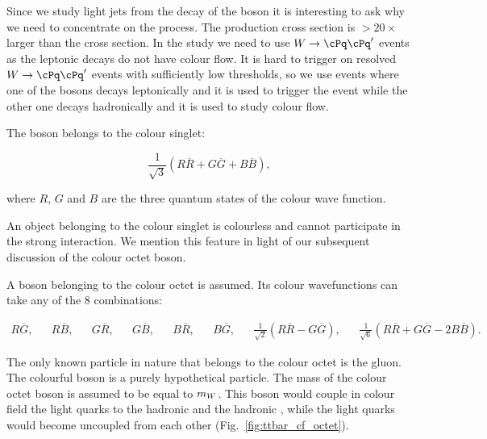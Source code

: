 Since we study light jets from the decay of the \PW boson it is interesting to ask why we need to concentrate on the \ttbar process. The \PW production cross section is $>20\times$ larger than the \ttbar cross section. In the study we need to use  $\PW\rightarrow\cPq\cPq'$ events as the leptonic decays do not have colour flow. It is hard to trigger on resolved $\PW\rightarrow\cPq\cPq'$ events with sufficiently low \pt thresholds, so we use \ttbar events where one of the \PW bosons decays leptonically and it is used to trigger the event while the other one decays hadronically and it is used to study colour flow.

The \PW boson belongs to the colour singlet:

\begin{equation}
\frac{1}{\sqrt{3}}\left(R\overline{R}+G\overline{G}+B\overline{B}\right),
\end{equation}

\noindent where $R$, $G$ and $B$ are the three quantum states of the colour wave function.

An object belonging to the colour singlet is colourless and cannot participate in the strong interaction. We mention this feature in light of our subsequent discussion of the colour octet \PW boson.


A \PW boson belonging to the colour octet is assumed. Its colour wavefunctions can take any of the 8 combinations:

\begin{align}
R\overline{G}, &&
R\overline{B}, &&
G\overline{R}, &&
G\overline{B}, &&
B\overline{R}, &&
B\overline{G}, &&
\frac{1}{\sqrt{2}}\left(R\overline{R}-G\overline{G}\right), &&
\frac{1}{\sqrt{6}}\left(R\overline{R}+G\overline{G}-2B\overline{B}\right).
\end{align}

The only known particle in nature that belongs to the colour octet is the gluon. The colourful \PW boson is a purely hypothetical particle. The mass of the colour octet \PW boson is assumed to be equal to $m_{W}$. This boson would couple in colour field the light quarks to the hadronic \cPqb and the hadronic \cPqt, while the light quarks would become uncoupled from each other (Fig.~\ref{fig:ttbar_cf_octet}).

